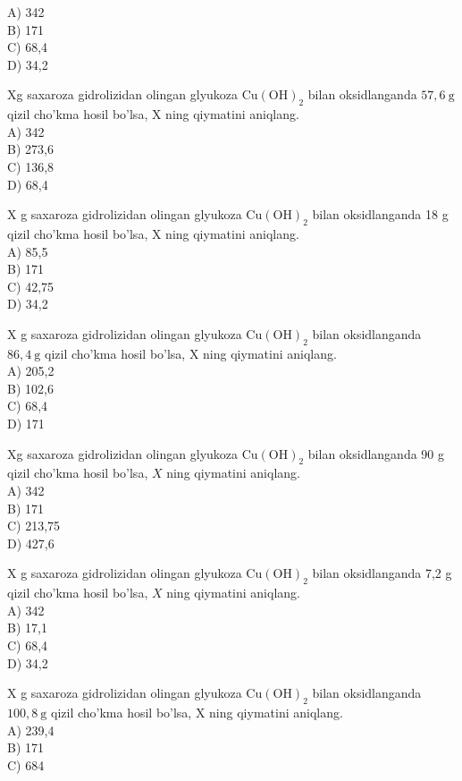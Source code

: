 A) 342\\
B) 171\\
C) 68,4\\
D) 34,2
  \item Xg saxaroza gidrolizidan olingan glyukoza $\mathrm{Cu}(\mathrm{OH})_{2}$ bilan oksidlanganda $57,6 \mathrm{~g}$ qizil cho'kma hosil bo'lsa, X ning qiymatini aniqlang.\\
A) 342\\
B) 273,6\\
C) 136,8\\
D) 68,4
  \item X g saxaroza gidrolizidan olingan glyukoza $\mathrm{Cu}(\mathrm{OH})_{2}$ bilan oksidlanganda 18 g qizil cho'kma hosil bo'lsa, X ning qiymatini aniqlang.\\
A) 85,5\\
B) 171\\
C) 42,75\\
D) 34,2
  \item X g saxaroza gidrolizidan olingan glyukoza $\mathrm{Cu}(\mathrm{OH})_{2}$ bilan oksidlanganda $86,4 \mathrm{~g}$ qizil cho'kma hosil bo'lsa, X ning qiymatini aniqlang.\\
A) 205,2\\
B) 102,6\\
C) 68,4\\
D) 171
  \item Xg saxaroza gidrolizidan olingan glyukoza $\mathrm{Cu}(\mathrm{OH})_{2}$ bilan oksidlanganda 90 g qizil cho'kma hosil bo'lsa, $X$ ning qiymatini aniqlang.\\
A) 342\\
B) 171\\
C) 213,75\\
D) 427,6
  \item X g saxaroza gidrolizidan olingan glyukoza $\mathrm{Cu}(\mathrm{OH})_{2}$ bilan oksidlanganda 7,2 g qizil cho'kma hosil bo'lsa, $X$ ning qiymatini aniqlang.\\
A) 342\\
B) 17,1\\
C) 68,4\\
D) 34,2
  \item X g saxaroza gidrolizidan olingan glyukoza $\mathrm{Cu}(\mathrm{OH})_{2}$ bilan oksidlanganda $100,8 \mathrm{~g}$ qizil cho'kma hosil bo'lsa, X ning qiymatini aniqlang.\\
A) 239,4\\
B) 171\\
C) 684\\
